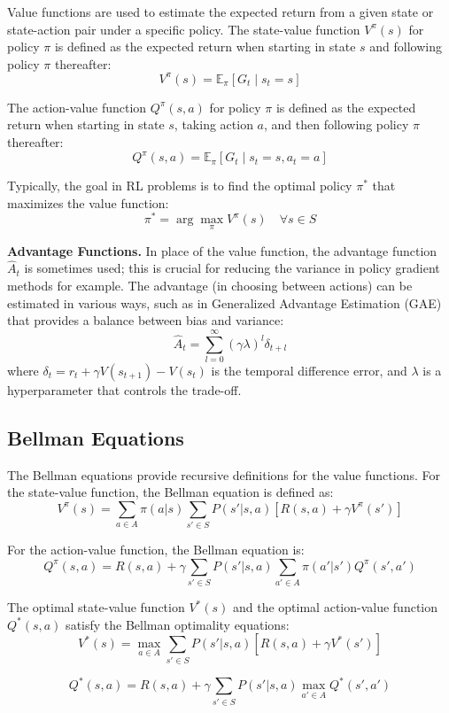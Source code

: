 Value functions are used to estimate the expected return from a given state or state-action pair under a specific policy.
The state-value function $V^{\pi}(s)$ for policy $\pi$ is defined as the expected return when starting in state $s$ and following policy $\pi$ thereafter:
\[
V^{\pi}(s) = \mathbb{E}_{\pi} \left[ G_t \mid s_t = s \right]
\]

The action-value function $Q^{\pi}(s, a)$ for policy $\pi$ is defined as the expected return when starting in state $s$, taking action $a$, and then following policy $\pi$ thereafter:
\[
Q^{\pi}(s, a) = \mathbb{E}_{\pi} \left[ G_t \mid s_t = s, a_t = a \right]
\]

Typically, the goal in \gls{RL} problems is to find the optimal policy $\pi^*$ that maximizes the value function:
\[
\pi^* = \arg\max_{\pi} V^{\pi}(s) \quad \forall s \in S
\]

\textbf{Advantage Functions.} In place of the value function, the advantage function $\hat{A}_t$ is sometimes used; this is crucial for reducing the variance in policy gradient methods for example.
The advantage (in choosing between actions) can be estimated in various ways, such as in Generalized Advantage Estimation (GAE) that provides a balance between bias and variance:
\[
\hat{A}_t = \sum_{l=0}^{\infty} (\gamma \lambda)^l \delta_{t+l}
\]
where $\delta_t = r_t + \gamma V(s_{t+1}) - V(s_t)$ is the temporal difference error, and $\lambda$ is a hyperparameter that controls the trade-off.

\subsection{Bellman Equations}

The Bellman equations provide recursive definitions for the value functions.
For the state-value function, the Bellman equation is defined as:
\[
V^{\pi}(s) = \sum_{a \in A} \pi(a|s) \sum_{s' \in S} P(s'|s,a) \left[ R(s,a) + \gamma V^{\pi}(s') \right]
\]

For the action-value function, the Bellman equation is:
\[
Q^{\pi}(s, a) = R(s,a) + \gamma \sum_{s' \in S} P(s'|s,a) \sum_{a' \in A} \pi(a'|s') Q^{\pi}(s', a')
\]

The optimal state-value function $V^*(s)$ and the optimal action-value function $Q^*(s, a)$ satisfy the Bellman optimality equations:
\[
V^*(s) = \max_{a \in A} \sum_{s' \in S} P(s'|s,a) \left[ R(s,a) + \gamma V^*(s') \right]
\]

\[
Q^*(s, a) = R(s,a) + \gamma \sum_{s' \in S} P(s'|s,a) \max_{a' \in A} Q^*(s', a')
\]

